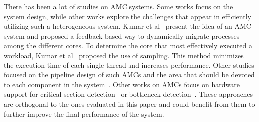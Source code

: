 \iffalse
\mm{I don't think we have to focus so much in schedulers. I would also add other things, like HW support, runtime extensions, or application modifications for heterogeneous systems.}

\mm{Missing refs: the CATS ICS 2015~\cite{Chronaki:ICS2015}, all OmpSs support for GPU+CPU systems and other heterogeneous platforms~\cite{Bueno:IPDPS2012,Planas:IPDPS2013,Planas:ICCS2015}.} 

\mm{Also missing all the papers from Onur Mutlu on Asymmetric Multicores}

\mm{Maybe we can include some performance characterization of real machines. At BSC, we have a good paper track on this: POWER5 decode priorities (ISCA 2005), POWER7 prefetcher (PACT), UltraSPARC T1 (MICRO, Petar), etc.}
\fi



There has been a lot of studies on AMC systems. Some works focus on the system design, while other works explore the challenges that appear in efficiently utilizing such a heterogeneous system.
Kumar et al~\cite{Kumar_micro_2003} present the idea of an AMC system and proposed a feedback-based way to dynamically migrate processes among the different cores. 
To determine the core that most effectively executed a workload, Kumar et al~\cite{Kumar:ISCA2004} proposed the use of sampling. This method minimizes the execution time of each single thread and increases performance. Other studies focused on the pipeline design of such AMCs and the area that should be devoted to each component in the system~\cite{Balakrishnan:ISCA2005, Morad_area_based}. Other works on AMCs focus on hardware support for critical section detection~\cite{Suleman:APLOS2009} or bottleneck detection~\cite{Joao:ASPLOS2012,Joao:ISCA2013}.
These approaches are orthogonal to the ones evaluated in this paper and could benefit from them to further improve the final performance of the system.

